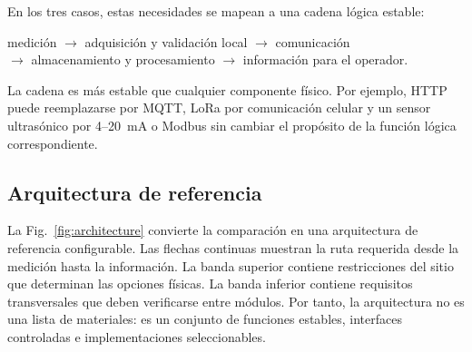 \documentclass[conference]{IEEEtran}
\begin{document}
En los tres casos, estas necesidades se mapean a una cadena lógica estable:
\begin{center}
\small medición $\rightarrow$ adquisición y validación local $\rightarrow$ comunicación\\
$\rightarrow$ almacenamiento y procesamiento $\rightarrow$ información para el operador.
\end{center}

La cadena es más estable que cualquier componente físico. Por ejemplo, HTTP puede reemplazarse por MQTT, LoRa por comunicación celular y un sensor ultrasónico por 4--20~mA o Modbus sin cambiar el propósito de la función lógica correspondiente.

\subsection{Arquitectura de referencia}

La Fig.~\ref{fig:architecture} convierte la comparación en una arquitectura de referencia configurable. Las flechas continuas muestran la ruta requerida desde la medición hasta la información. La banda superior contiene restricciones del sitio que determinan las opciones físicas. La banda inferior contiene requisitos transversales que deben verificarse entre módulos. Por tanto, la arquitectura no es una lista de materiales: es un conjunto de funciones estables, interfaces controladas e implementaciones seleccionables.
\end{document}
